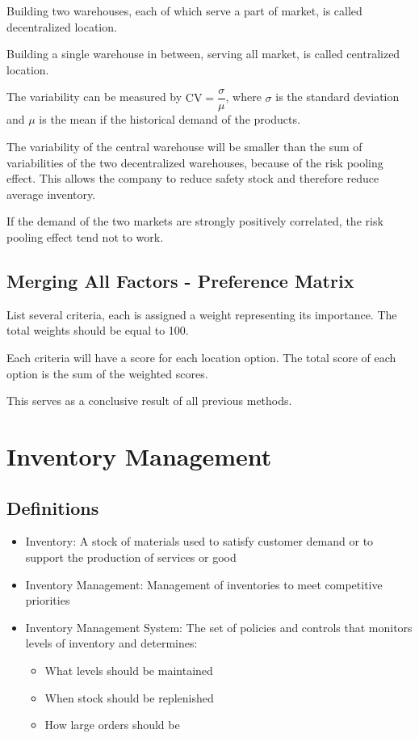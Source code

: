 \documentclass{article}
\begin{document}
Building two warehouses, each of which serve a part of market, is called decentralized location.

Building a single warehouse in between, serving all market, is called centralized location.

The variability can be measured by $\text{CV} = \dfrac{\sigma}{\mu}$,
where $\sigma$ is the standard deviation and $\mu$ is the mean if the historical demand of the products.

The variability of the central warehouse will be smaller than the sum of variabilities of the
two decentralized warehouses, because of the risk pooling effect.
This allows the company to reduce safety stock and therefore reduce average inventory.

If the demand of the two markets are strongly positively correlated,
the risk pooling effect tend not to work.

\subsection{Merging All Factors - Preference Matrix}

List several criteria, each is assigned a weight representing its importance.
The total weights should be equal to 100.

Each criteria will have a score for each location option.
The total score of each option is the sum of the weighted scores.

This serves as a conclusive result of all previous methods.

\section{Inventory Management}

\subsection{Definitions}

\begin{itemize}
	\item Inventory: A stock of materials used to satisfy customer demand or to support the production of services or good
	\item Inventory Management: Management of inventories to meet competitive priorities
	\item Inventory Management System: The set of policies and controls that monitors levels of inventory and determines:
	      \begin{itemize}
		      \item What levels should be maintained
		      \item When stock should be replenished
		      \item How large orders should be
	      \end{itemize}
\end{itemize}
\end{document}
